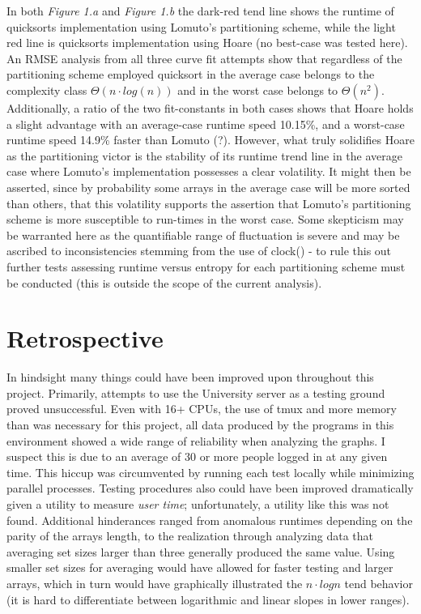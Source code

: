 \documentclass[11pt,letterpaper]{report}
\begin{document}
In both \emph{Figure 1.a} and \emph{Figure 1.b} the dark-red tend line shows the runtime of quicksorts implementation using Lomuto's partitioning scheme, while the light red line is quicksorts implementation using Hoare (no best-case was tested here). An RMSE analysis from all three curve fit attempts show that regardless of the partitioning scheme employed quicksort in the average case belongs to the complexity class $\Theta (n \cdot log{}(n))$ and in the worst case belongs to $\Theta(n^2)$. Additionally, a ratio of the two fit-constants in both cases shows that Hoare holds a slight advantage with an average-case runtime speed 10.15\%, and a worst-case runtime speed 14.9\% faster than Lomuto (?). However, what truly solidifies Hoare as the partitioning victor is the stability of its runtime trend line in the average case where Lomuto's implementation possesses a clear volatility. It might then be asserted, since by probability some arrays in the average case will be more sorted than others, that this volatility supports the assertion that Lomuto's partitioning scheme is more susceptible to run-times in the worst case. Some skepticism may be warranted here as the quantifiable range of fluctuation is severe and may be ascribed to inconsistencies stemming from the use of clock() - to rule this out further tests assessing runtime versus entropy for each partitioning scheme must be conducted (this is outside the scope of the current analysis).


\section*{Retrospective} %
In hindsight many things could have been improved upon throughout this project. Primarily, attempts to use the University server as a testing ground proved unsuccessful. Even with 16+ CPUs, the use of tmux and more memory than was necessary for this project, all data produced by the programs in this environment showed a wide range of reliability when analyzing the graphs. I suspect this is due to an average of 30 or more people logged in at any given time. This hiccup was circumvented by running each test locally while minimizing parallel processes. Testing procedures also could have been improved dramatically given a utility to measure \emph{user time}; unfortunately, a utility like this was not found. Additional hinderances ranged from anomalous runtimes depending on the parity of the arrays length, to the realization through analyzing data that averaging set sizes larger than three generally produced the same value. Using smaller set sizes for averaging would have allowed for faster testing and larger arrays, which in turn would have graphically illustrated the $n \cdot log{}n$ tend behavior (it is hard to differentiate between logarithmic and linear slopes in lower ranges).
\end{document}

